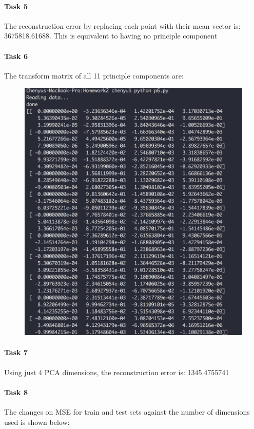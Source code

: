 \documentclass[a4paper,11pt]{article}
\theoremstyle{mytheor}
\begin{document}
\paragraph{Task 5}
The reconstruction error by replacing each point with their mean vector is: 3675818.61688. This is equivalent to having no principle component


\paragraph{Task 6}
The transform matrix of all 11 principle components are:
\begin{figure}[h]
\centerline{\includegraphics[width=15cm]{p6.png}}
\end{figure}

\paragraph{Task 7}
Using just 4 PCA dimensions, the reconstruction error is: 1345.4755741

\paragraph{Task 8}
The changes on MSE for train and test sets against the number of dimensions used is shown below:
\end{document}
